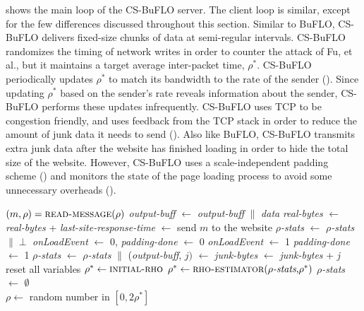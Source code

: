 \documentclass[10pt,journal]{IEEEtran}
\newcommand{\initialrho}{{\sc\textsc{initial-rho}}\xspace}
\newcommand{\buflo} {BuFLO\xspace}
\newcommand{\csbuflo} {Congestion-Sensitive BuFLO\xspace}
\newcommand{\csb} {CS-BuFLO\xspace}
\begin{document}
 shows the main loop of the \csb server.  The
client loop is similar, except for the few differences discussed
throughout this section.  Similar to \buflo, \csb delivers
fixed-size chunks of data at semi-regular intervals.  \csb randomizes
the timing of network writes in order to counter the attack of Fu, et
al.\cite{fu-iaw03}, but it maintains a target average inter-packet
time, $\rho^*$.  \csb periodically updates $\rho^*$ to match its
bandwidth to the rate of the sender ().
Since updating $\rho^*$ based on the sender's rate reveals information
about the sender, \csb performs these updates infrequently.  \csb uses
TCP to be congestion friendly, and uses feedback from the TCP stack in
order to reduce the amount of junk data it needs to send
().  Also like \buflo, \csb
transmits extra junk data after the website has finished loading in
order to hide the total size of the website.  However, \csb uses a
scale-independent padding scheme () and
monitors the state of the page loading process to avoid some
unnecessary overheads  ().



\begin{algorithm}[ht!]
  \caption{The main loop of the \csbuflo server.}
  \label{alg:csbuflo-server}
  \begin{algorithmic}
        \State $(m,\rho) = \Call{read-message}{\rho}$
			\State \emph{output-buff} $\gets$ \emph{output-buff} $\|$ \emph{data}
\State \emph{real-bytes} $\gets$ \emph{real-bytes} + 
          \State \emph{last-site-response-time} $\gets$ 
          \State send $m$ to the website
		  \State \emph{$\rho$-stats} $\gets$ \emph{$\rho$-stats} $\| \perp$ 
\State \emph{onLoadEvent} $\gets$ 0, \emph{padding-done} $\gets$ 0
          \State \emph{onLoadEvent} $\gets$ 1
          \State \emph{padding-done} $\gets$ 1
		  \State \emph{$\rho$-stats} $\gets$ \emph{$\rho$-stats} $\|$  
\EndIf
          \State (\emph{output-buff}, $j)$ $\gets$ 
          \State \emph{junk-bytes} $\gets$ \emph{junk-bytes} + \emph{j}
        \EndIf
{}
			\State reset all variables
\Else{}
          \If{$\rho^*=\infty$} 
            \State $\rho^* \gets \initialrho$
            \State $\rho^* \gets \Call{rho-estimator}{\rho$\emph{-stats},$\rho^*}$
            \State $\rho$\emph{-stats} $\gets$ $\emptyset$ 
          \EndIf
          \\
            \State $\rho \gets$ random number in $[0,2\rho^*]$
          \EndIf
        \EndIf
      \EndWhile
    \EndFunction
  \end{algorithmic}
\end{algorithm}
\end{document}
